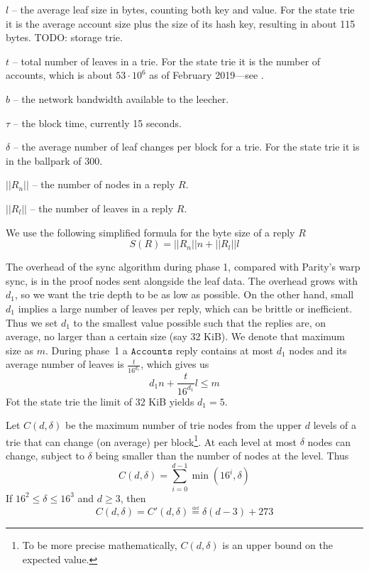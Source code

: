 \documentclass{amsart}
\begin{document}
$l$ -- the average leaf size in bytes, counting both key and value.
For the state trie it is the average account size plus the size of its hash key,
resulting in about 115 bytes.
TODO: storage trie.

$t$ -- total number of leaves in a trie.
For the state trie it is the number of accounts,
which is about $53 \cdot 10^6$ as of February 2019---see \cite{akhunov_1x_workshop_part2}.

$b$ -- the network bandwidth available to the leecher.

$\tau$ -- the block time, currently 15 seconds.

$\delta$ -- the average number of leaf changes per block for a trie.
For the state trie it is in the ballpark of 300.

$||R_n||$ -- the number of nodes in a reply $R$.

$||R_l||$ -- the number of leaves in a reply $R$.

We use the following simplified formula for the byte size of a reply $R$
\begin{equation}
    S(R) = ||R_n|| n + ||R_l|| l
\end{equation}

The overhead of the sync algorithm during phase 1, compared with Parity's warp sync, is in the proof nodes sent alongside the leaf data.
The overhead grows with $d_1$, so we want the trie depth to be as low as possible.
On the other hand, small $d_1$ implies a large number of leaves per reply, which can be brittle or inefficient.
Thus we set $d_1$ to the smallest value possible such that the replies are, on average, no larger than a certain size (say 32 KiB).
We denote that maximum size as $m$.
During phase~1 a $\texttt{Accounts}$ reply contains at most $d_1$ nodes
and its average number of leaves is $\frac{t}{16^{d_1}}$,
which gives us
\begin{equation}
    d_1 n + \frac{t}{16^{d_1}} l \leq m
\end{equation}
Fot the state trie the limit of 32 KiB yields $d_1 = 5$.

Let $C(d, \delta)$ be the maximum number of trie nodes from the upper $d$ levels of a trie that can change (on average) per block\footnote{To
be more precise mathematically, $C(d, \delta)$ is an upper bound on the expected value.}.
At each level at most $\delta$ nodes can change, subject to $\delta$ being smaller than the number of nodes at the level.
Thus
\begin{equation}
    C(d, \delta) = \sum_{i=0}^{d-1} \min(16^i, \delta)
\end{equation}
If $16^2 \leq \delta \leq 16^3$ and $d \geq 3$, then
\begin{equation}
    C(d, \delta) = C'(d, \delta) \overset{\underset{\mathrm{def}}{}}{=}
     \delta (d-3) + 273
\end{equation}
\end{document}
